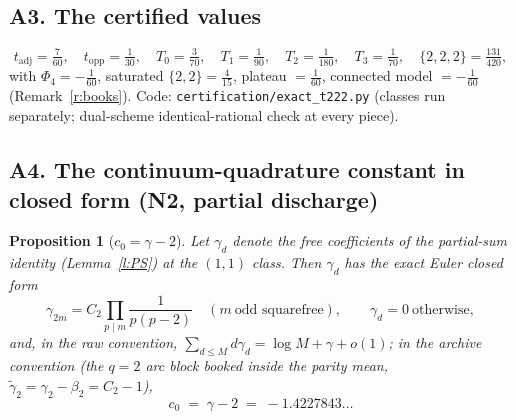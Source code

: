 \documentclass[11pt]{article}
\numberwithin{equation}{section}
\newtheorem{proposition}[theorem]{Proposition}
\theoremstyle{definition}
\theoremstyle{remark}
\begin{document}
\subsection*{A3. The certified values}

\[
t_{\mathrm{adj}}=\tfrac7{60},\quad
t_{\mathrm{opp}}=\tfrac1{30},\quad
T_0=\tfrac3{70},\quad
T_1=\tfrac1{90},\quad
T_2=\tfrac1{180},\quad
T_3=\tfrac1{70},\quad
\{2,2,2\}=\tfrac{131}{420},
\]
with $\Phi_4=-\tfrac1{60}$, saturated $\{2,2\}=\tfrac4{15}$,
plateau $=\tfrac1{60}$, connected model $=-\tfrac1{60}$
(Remark~\ref{r:books}). Code:
\texttt{certification/exact\_t222.py} (classes run separately;
dual-scheme identical-rational check at every piece).

\subsection*{A4. The continuum-quadrature constant in closed form
(N2, partial discharge)}

\begin{proposition}[$c_0=\gamma-2$]\label{p:c0}
Let $\gamma_d$ denote the free coefficients of the partial-sum
identity (Lemma~\ref{l:PS}) at the $(1,1)$ class. Then
$\gamma_d$ has the exact Euler closed form
\[
\gamma_{2m}=C_2\prod_{p\mid m}\frac1{p(p-2)}
\quad(m\ \text{odd squarefree}),\qquad
\gamma_d=0\ \text{otherwise},
\]
and, in the raw convention,
$\sum_{d\le M}d\gamma_d=\log M+\gamma+o(1)$; in the archive
convention (the $q=2$ arc block booked inside the parity mean,
$\widetilde\gamma_2=\gamma_2-\beta_2=C_2-1$),
\[
c_0\;=\;\gamma-2\;=\;-1.4227843\ldots
\]
\end{proposition}
\end{document}
